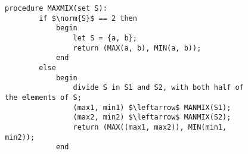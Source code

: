 \documentclass{subfiles}
\begin{document}
\begin{figure}[!h]
    \centering
    \begin{lstlisting}[language = algol]
    procedure MAXMIX(set S):
        if $\norm{S}$ == 2 then
            begin
                let S = {a, b};
                return (MAX(a, b), MIN(a, b));
            end
        else
            begin
                divide S in S1 and S2, with both half of the elements of S;
                (max1, min1) $\leftarrow$ MANMIX(S1);
                (max2, min2) $\leftarrow$ MANMIX(S2);
                return (MAX((max1, max2)), MIN(min1, min2));
            end
\end{lstlisting}
\end{figure}
\end{document}
